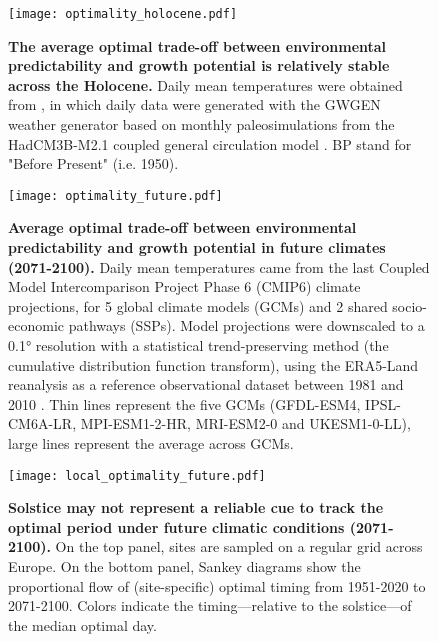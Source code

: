 \documentclass[11pt,letter]{article}
\begin{document}
\begin{figure}[h]
\hspace*{-1.2cm}
\texttt{[image: optimality\_holocene.pdf]}
\vspace*{-0.7cm}
\caption{\textbf{The average optimal trade-off between environmental predictability and growth potential is relatively stable across the Holocene.} Daily mean temperatures were obtained from \citet{VanderMeersch2024}, in which daily data were generated with the GWGEN weather generator \citep{Sommer2017} based on monthly paleosimulations from the HadCM3B-M2.1 coupled general circulation model \citep{Armstrong2019}. BP stand for "Before Present" (i.e. 1950).}
\label{fig:holocene}
\end{figure}


\vspace*{-0.7cm}
\begin{figure}[h]
\centering
\texttt{[image: optimality\_future.pdf]}
\vspace*{-0.5cm}
\caption{\textbf{Average optimal trade-off between environmental predictability and growth potential in future climates (2071-2100).} Daily mean temperatures came from the last Coupled Model Intercomparison Project Phase 6 (CMIP6) climate  projections, for 5 global climate models (GCMs) and 2 shared socio-economic pathways (SSPs). Model projections were downscaled to a 0.1° resolution with a statistical trend-preserving method (the cumulative distribution function transform), using the ERA5-Land reanalysis as a reference observational dataset between 1981 and 2010 \citep{Noel2022}. Thin lines represent the five GCMs (GFDL-ESM4, IPSL-CM6A-LR, MPI-ESM1-2-HR, MRI-ESM2-0 and UKESM1-0-LL), large lines represent the average across GCMs.}
\label{fig:future}
\vspace*{-10cm}
\end{figure}

\clearpage

\vspace*{-1.2cm}
\begin{figure}[h]
\centering
\texttt{[image: local\_optimality\_future.pdf]}
\vspace*{-0.4cm}
\caption{\textbf{Solstice may not represent a reliable cue to track the optimal period under future climatic conditions (2071-2100).} On the top panel, sites are sampled on a regular grid across Europe. On the bottom panel, Sankey diagrams show the proportional flow of (site-specific) optimal timing from 1951-2020 to 2071-2100. Colors indicate the timing—relative to the solstice—of the median optimal day.}
\label{fig:holocene}
\end{figure}

{\footnotesize
\vspace*{0cm}
}
\end{document}
